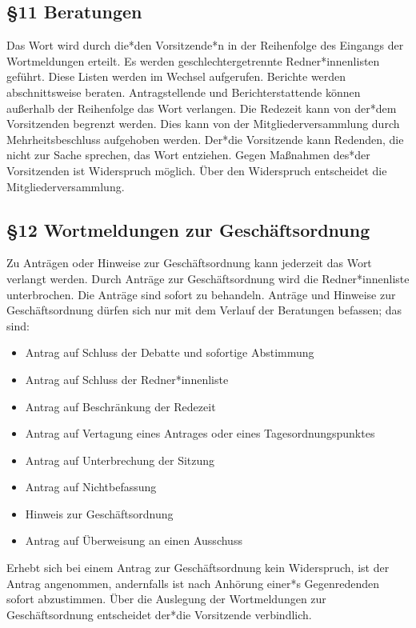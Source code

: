 \documentclass[12pt]{report}
\begin{document}
\begin{flushleft}
\subsection*{§11 Beratungen}
Das Wort wird durch die*den Vorsitzende*n in der Reihenfolge des Eingangs der Wortmeldungen erteilt.
{\color{red} Es werden geschlechtergetrennte Redner*innenlisten geführt. Diese Listen werden im Wechsel aufgerufen.} Berichte werden
abschnittsweise beraten. Antragstellende und Berichterstattende können außerhalb der Reihenfolge das
Wort verlangen. Die Redezeit kann von der*dem Vorsitzenden begrenzt werden. Dies kann von der 
Mitgliederversammlung durch Mehrheitsbeschluss aufgehoben werden. Der*die Vorsitzende kann Redenden, die
nicht zur Sache sprechen, das Wort entziehen. Gegen Maßnahmen des*der Vorsitzenden ist Widerspruch
möglich. Über den Widerspruch entscheidet die Mitgliederversammlung.
\subsection*{§12 Wortmeldungen zur Geschäftsordnung}
Zu Anträgen oder Hinweise zur Geschäftsordnung kann jederzeit das Wort verlangt werden. Durch Anträge
zur Geschäftsordnung wird die {\color{red}Redner*innenliste} unterbrochen. Die Anträge sind sofort zu behandeln. Anträge und
Hinweise zur Geschäftsordnung dürfen sich nur mit dem Verlauf der Beratungen befassen; das sind:

\begin{itemize}
  \item Antrag auf Schluss der Debatte und sofortige Abstimmung
  \item Antrag auf Schluss der {\color{red}Redner*innenliste}
  \item Antrag auf Beschränkung der Redezeit
  \item Antrag auf Vertagung eines Antrages oder eines Tagesordnungspunktes
  \item Antrag auf Unterbrechung der Sitzung
  \item Antrag auf Nichtbefassung
  \item Hinweis zur Geschäftsordnung
  \item Antrag auf Überweisung an einen Ausschuss
\end{itemize}

Erhebt sich bei einem Antrag zur Geschäftsordnung kein Widerspruch, ist der Antrag angenommen,
andernfalls ist nach Anhörung einer*s Gegenredenden sofort abzustimmen. Über die Auslegung der Wortmeldungen
zur Geschäftsordnung entscheidet der*die Vorsitzende verbindlich.


\end{flushleft}
\end{document}
